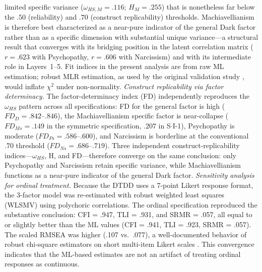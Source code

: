 \documentclass[11pt,twocolumn]{article}
\begin{document}
limited specific variance ($\omega_{HS,M} = .116$; $H_M = .255$) that is nonetheless far below the $.50$ (reliability) and $.70$ (construct replicability) thresholds. Machiavellianism is therefore best characterized as a near-pure indicator of the general Dark factor rather than as a specific dimension with substantial unique variance---a structural result that converges with its bridging position in the latent correlation matrix ($r = .623$ with Psychopathy, $r = .606$ with Narcissism) and with its intermediate role in Layers~1--5. Fit indices in the present analysis are from raw ML estimation; robust MLR estimation, as used by the original validation study \citep{zivna2025}, would inflate $\chi^2$ under non-normality. \textit{Construct replicability via factor determinacy.} The \citet{rodriguez2016} factor-determinacy index (FD) independently reproduces the $\omega_{HS}$ pattern across all specifications: FD for the general factor is high ($FD_D = .842$--$.846$), the Machiavellianism specific factor is near-collapse ($FD_{Ms} = .149$ in the symmetric specification, $.207$ in S$\cdot$I-1), Psychopathy is moderate ($FD_{Ps} = .586$--$.600$), and Narcissism is borderline at the conventional $.70$ threshold ($FD_{Ns} = .686$--$.719$). Three independent construct-replicability indices---$\omega_{HS}$, H, and FD---therefore converge on the same conclusion: only Psychopathy and Narcissism retain specific variance, while Machiavellianism functions as a near-pure indicator of the general Dark factor. \textit{Sensitivity analysis for ordinal treatment.} Because the DTDD uses a 7-point Likert response format, the 3-factor model was re-estimated with robust weighted least squares (WLSMV) using polychoric correlations. The ordinal specification reproduced the substantive conclusion: CFI = .947, TLI = .931, and SRMR = .057, all equal to or slightly better than the ML values (CFI = .941, TLI = .923, SRMR = .057). The scaled RMSEA was higher (.107 vs.\ .077), a well-documented behavior of robust chi-square estimators on short multi-item Likert scales \citep{rhemtulla2012}. This convergence indicates that the ML-based estimates are not an artifact of treating ordinal responses as continuous.
\end{document}
